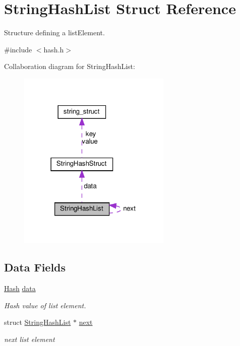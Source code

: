 \hypertarget{struct_string_hash_list}{}\section{String\+Hash\+List Struct Reference}
\label{struct_string_hash_list}


Structure defining a list\+Element.  




{\ttfamily \#include $<$hash.\+h$>$}



Collaboration diagram for String\+Hash\+List\+:
\nopagebreak
\begin{figure}[H]
\begin{center}
\leavevmode
\includegraphics[width=207pt]{struct_string_hash_list__coll__graph}
\end{center}
\end{figure}
\subsection*{Data Fields}
\begin{DoxyCompactItemize}
\item 
\hyperlink{hash_8h_aaae8e320515f4ba6ab5e8bc4ecd7f58a}{Hash} \hyperlink{struct_string_hash_list_a0bb0e5ff64b92afb24dffc5a8835c55d}{data}
\begin{DoxyCompactList}\small\item\em Hash value of list element. \end{DoxyCompactList}\item 
struct \hyperlink{struct_string_hash_list}{String\+Hash\+List} $\ast$ \hyperlink{struct_string_hash_list_a61c5f91e0504062e5408438d1a3c1e78}{next}
\begin{DoxyCompactList}\small\item\em next list element \end{DoxyCompactList}\end{DoxyCompactItemize}


